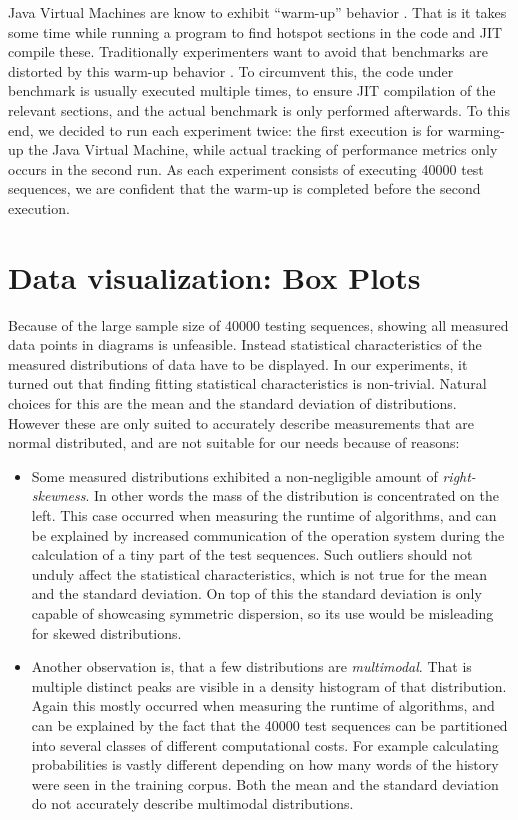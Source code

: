 Java Virtual Machines are know to exhibit \enquote{warm-up} behavior \noref.
That is it takes some time while running a program to find hotspot sections
in the code and JIT compile these.
Traditionally experimenters want to avoid that benchmarks are distorted by
this warm-up behavior \noref.
To circumvent this, the code under benchmark is usually executed multiple times,
to ensure JIT compilation of the relevant sections, and the actual benchmark
is only performed afterwards.
To this end, we decided to run each experiment twice:
the first execution is for warming-up the Java Virtual Machine, while actual
tracking of performance metrics only occurs in the second run.
As each experiment consists of executing \num{40000} test sequences, we are
confident that the warm-up is completed before the second execution.


\section{Data visualization: Box Plots}
\label{sec:boxplot}

Because of the large sample size of \num{40000} testing sequences, showing
all measured data points in diagrams is unfeasible.
Instead statistical characteristics of the measured distributions of data
have to be displayed.
In our experiments, it turned out that finding fitting statistical
characteristics is non-trivial.
Natural choices for this are the mean and the standard deviation of
distributions.
However these are only suited to accurately describe measurements that are
normal distributed, and are not suitable for our needs because of reasons:
\begin{itemize}
  \item Some measured distributions exhibited a non-negligible amount of
    \emph{right-skewness}.
    In other words the mass of the distribution is concentrated on the left.
    This case occurred when measuring the runtime of algorithms, and can be
    explained by increased communication of the operation system during the
    calculation of a tiny part of the test sequences.
    Such outliers should not unduly affect the statistical characteristics,
    which is not true for the mean and the standard deviation.
    On top of this the standard deviation is only capable of showcasing
    symmetric dispersion, so its use would be misleading for skewed
    distributions.
  \item Another observation is, that a few distributions are \emph{multimodal}.
    That is multiple distinct peaks are visible in a density histogram of that
    distribution.
    Again this mostly occurred when measuring the runtime of algorithms,
    and can be explained by the fact that the \num{40000} test sequences can
    be partitioned into several classes of different computational costs.
    For example calculating probabilities is vastly different depending on
    how many words of the history were seen in the training corpus.
    Both the mean and the standard deviation do not accurately describe
    multimodal distributions.
\end{itemize}

